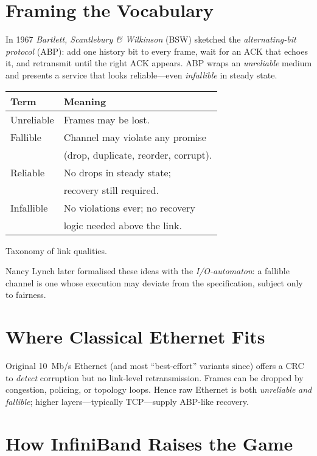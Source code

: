 \documentclass[../../../OAE-SPEC-MAIN.tex]{subfiles}
\begin{document}
\section{Framing the Vocabulary}

In 1967 \emph{Bartlett, Scantlebury \& Wilkinson} (BSW) sketched the
\emph{alternating-bit protocol} (ABP): add one history bit to every frame,
wait for an ACK that echoes it, and retransmit until the right ACK appears.
ABP wraps an \emph{unreliable} medium and presents a service that looks
reliable---even \emph{infallible} in steady state.

\begin{marginfigure}
  \footnotesize
  \centering
  \begin{tabular}{@{}l@{~}l@{}}
    \toprule
    Term & Meaning\\
    \midrule
    Unreliable & Frames may be lost.\\
    Fallible   & Channel may violate any promise\\
               & (drop, duplicate, reorder, corrupt).\\
    Reliable   & No drops in steady state;\\
               & recovery still required.\\
    Infallible & No violations ever; no recovery\\
               & logic needed above the link.\\
    \bottomrule
  \end{tabular}
  \caption{Taxonomy of link qualities.\label{tab:taxonomy}}
\end{marginfigure}

Nancy Lynch later formalised these ideas with the
\emph{I/O-automaton}: a fallible channel is one whose execution may
deviate from the specification, subject only to fairness.

\section{Where Classical Ethernet Fits}

Original 10~Mb/s Ethernet (and most ``best-effort'' variants since) offers a
CRC to \emph{detect} corruption but no link-level
retransmission. Frames can be dropped by congestion, policing, or topology
loops. Hence raw Ethernet is both \emph{unreliable} \emph{and} \emph{fallible};
higher layers---typically TCP---supply ABP-like recovery.

\section{How InfiniBand Raises the Game}
\end{document}
